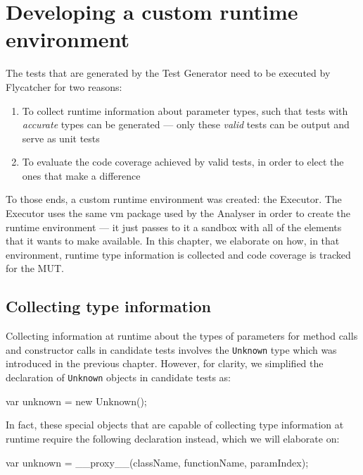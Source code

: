 \chapter{Developing a custom runtime environment}
The tests that are generated by the \textsf{Test Generator} need to be executed by \textsf{Flycatcher} for two reasons:

\begin{enumerate}
   \item To collect runtime information about parameter types, such that tests with \emph{accurate} types can be generated --- only these \emph{valid} tests can be output and serve as unit tests
   \item To evaluate the code coverage achieved by valid tests, in order to elect the ones that make a difference
\end{enumerate}

To those ends, a custom runtime environment was created: the \textsf{Executor}. The \textsf{Executor} uses the same \textsf{vm} package used by the \textsf{Analyser} in order to create the runtime environment --- it just passes to it a sandbox with all of the elements that it wants to make available. In this chapter, we elaborate on how, in that environment, runtime type information is collected and code coverage is tracked for the MUT.


\section{Collecting type information}
Collecting information at runtime about the types of parameters for method calls and constructor calls in candidate tests involves the \texttt{Unknown} type which was introduced in the previous chapter. However, for clarity, we simplified the declaration of \texttt{Unknown} objects in candidate tests as:

\begin{code}
var unknown = new Unknown();
\end{code}

\noindent In fact, these special objects that are capable of collecting type information at runtime require the following declaration instead, which we will elaborate on:

\begin{code}
var unknown = __proxy__(className, functionName, paramIndex);
\end{code}

